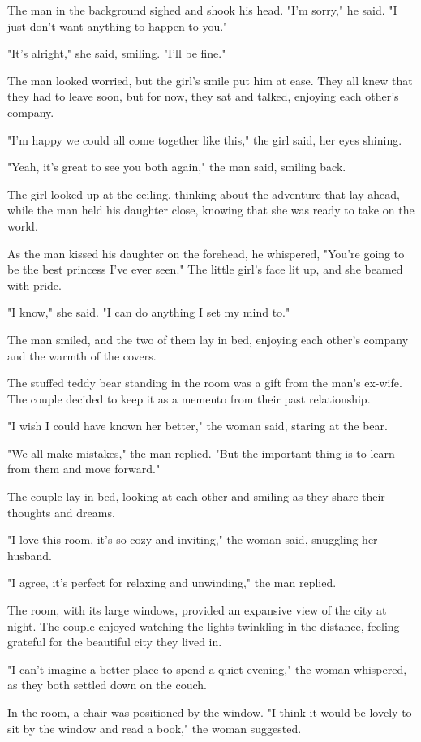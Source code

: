 \documentclass[smalldemyvopaper,11pt,twoside,onecolumn,openright,extrafontsizes]{memoir}
\begin{document}
The man in the background sighed and shook his head. "I'm sorry," he said. "I just don't want anything to happen to you."\par
"It's alright," she said, smiling. "I'll be fine."\par
The man looked worried, but the girl's smile put him at ease. They all knew that they had to leave soon, but for now, they sat and talked, enjoying each other's company.\par
"I'm happy we could all come together like this," the girl said, her eyes shining.\par
"Yeah, it's great to see you both again," the man said, smiling back.\par
The girl looked up at the ceiling, thinking about the adventure that lay ahead, while the man held his daughter close, knowing that she was ready to take on the world.\par
As the man kissed his daughter on the forehead, he whispered, "You're going to be the best princess I've ever seen." The little girl's face lit up, and she beamed with pride.\par
"I know," she said. "I can do anything I set my mind to."\par
The man smiled, and the two of them lay in bed, enjoying each other's company and the warmth of the covers.\par
The stuffed teddy bear standing in the room was a gift from the man's ex-wife. The couple decided to keep it as a memento from their past relationship.\par
"I wish I could have known her better," the woman said, staring at the bear.\par
"We all make mistakes," the man replied. "But the important thing is to learn from them and move forward."\par
The couple lay in bed, looking at each other and smiling as they share their thoughts and dreams.\par
"I love this room, it's so cozy and inviting," the woman said, snuggling her husband.\par
"I agree, it's perfect for relaxing and unwinding," the man replied.\par
The room, with its large windows, provided an expansive view of the city at night. The couple enjoyed watching the lights twinkling in the distance, feeling grateful for the beautiful city they lived in.\par
"I can't imagine a better place to spend a quiet evening," the woman whispered, as they both settled down on the couch.\par
In the room, a chair was positioned by the window. "I think it would be lovely to sit by the window and read a book," the woman suggested.\par
\end{document}
